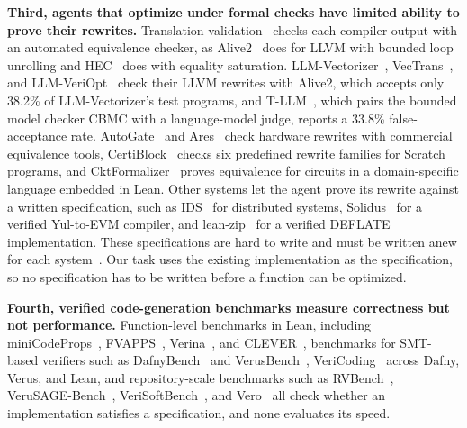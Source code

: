 \documentclass{article}
\newcommand{\verina}{Verina\xspace}
\begin{document}
\textbf{Third, agents that optimize under formal checks have limited ability to prove their rewrites.}
Translation validation~\citep{pnueli1998translation,necula2000translation} checks each compiler output with an automated equivalence checker, as Alive2~\citep{lopes2021alive2} does for LLVM with bounded loop unrolling and HEC~\citep{yin2025hec} does with equality saturation.
LLM-Vectorizer~\citep{taneja2025llm}, VecTrans~\citep{zheng2025vectrans}, and LLM-VeriOpt~\citep{fang2026llm} check their LLVM rewrites with Alive2, which accepts only 38.2\% of LLM-Vectorizer's test programs, and T-LLM~\citep{fazel2026tllm}, which pairs the bounded model checker CBMC with a language-model judge, reports a 33.8\% false-acceptance rate.
AutoGate~\citep{wang2026autogate} and Ares~\citep{cuyckens2026ares} check hardware rewrites with commercial equivalence tools, CertiBlock~\citep{si2026certificate} checks six predefined rewrite families for Scratch programs, and CktFormalizer~\citep{xiong2026cktformalizer} proves equivalence for circuits in a domain-specific language embedded in Lean.
Other systems let the agent prove its rewrite against a written specification, such as IDS~\citep{agarwal2026inductive} for distributed systems, Solidus~\citep{paradigm2026soliduscompiler} for a verified Yul-to-EVM compiler, and lean-zip~\citep{morrison2026leanzip} for a verified DEFLATE implementation.
These specifications are hard to write and must be written anew for each system~\citep{endres2024can,ye2026intent}.
Our task uses the existing implementation as the specification, so no specification has to be written before a function can be optimized.

\textbf{Fourth, verified code-generation benchmarks measure correctness but not performance.}
Function-level benchmarks in Lean, including miniCodeProps~\citep{lohn2024minicodeprops}, FVAPPS~\citep{dougherty2025provingcoding}, \verina{}~\citep{ye2026verina}, and CLEVER~\citep{thakur2025cleververified}, benchmarks for SMT-based verifiers such as DafnyBench~\citep{loughridge2025dafnybench} and VerusBench~\citep{chen2025automated}, VeriCoding~\citep{chiosa2026benchmark} across Dafny, Verus, and Lean, and repository-scale benchmarks such as RVBench~\citep{zhong2025towards}, VeruSAGE-Bench~\citep{yang2026verusage}, VeriSoftBench~\citep{xin2026verisoftbenchcolm}, and Vero~\citep{ye2026vero} all check whether an implementation satisfies a specification, and none evaluates its speed.
\end{document}
